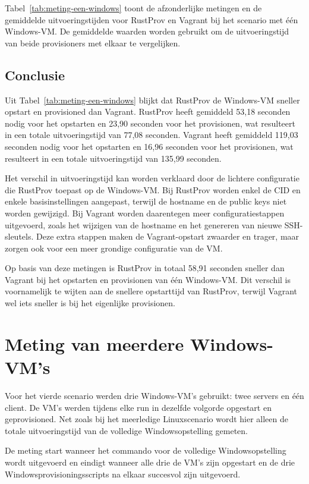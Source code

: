 Tabel~\ref{tab:meting-een-windows} toont de afzonderlijke metingen en de
gemiddelde uitvoeringstijden voor RustProv en Vagrant bij het scenario met één
Windows-VM. De gemiddelde waarden worden gebruikt om de uitvoeringstijd van
beide provisioners met elkaar te vergelijken.


\subsection{Conclusie}

Uit Tabel~\ref{tab:meting-een-windows} blijkt dat RustProv de Windows-VM sneller
opstart en provisioned dan Vagrant. RustProv heeft gemiddeld 53,18 seconden
nodig voor het opstarten en 23,90 seconden voor het provisionen, wat resulteert
in een totale uitvoeringstijd van 77,08 seconden. Vagrant heeft gemiddeld
119,03 seconden nodig voor het opstarten en 16,96 seconden voor het provisionen,
wat resulteert in een totale uitvoeringstijd van 135,99 seconden.

Het verschil in uitvoeringstijd kan worden verklaard door de lichtere
configuratie die RustProv toepast op de Windows-VM. Bij RustProv worden enkel de
CID en enkele basisinstellingen aangepast, terwijl de hostname en de public keys
niet worden gewijzigd. Bij Vagrant worden daarentegen meer configuratiestappen
uitgevoerd, zoals het wijzigen van de hostname en het genereren van nieuwe
SSH-sleutels. Deze extra stappen maken de Vagrant-opstart zwaarder en trager,
maar zorgen ook voor een meer grondige configuratie van de VM.

Op basis van deze metingen is RustProv in totaal 58,91 seconden sneller dan
Vagrant bij het opstarten en provisionen van één Windows-VM. Dit verschil is
voornamelijk te wijten aan de snellere opstarttijd van RustProv, terwijl Vagrant
wel iets sneller is bij het eigenlijke provisionen.

\section{Meting van meerdere Windows-VM's}

Voor het vierde scenario werden drie Windows-VM's gebruikt: twee servers en één
client. De VM's werden tijdens elke run in dezelfde volgorde opgestart en
geprovisioned. Net zoals bij het meerledige Linuxscenario wordt hier alleen de
totale uitvoeringstijd van de volledige Windowsopstelling gemeten.

De meting start wanneer het commando voor de volledige Windowsopstelling wordt
uitgevoerd en eindigt wanneer alle drie de VM's zijn opgestart en de drie
Windowsprovisioningsscripts na elkaar succesvol zijn uitgevoerd.

